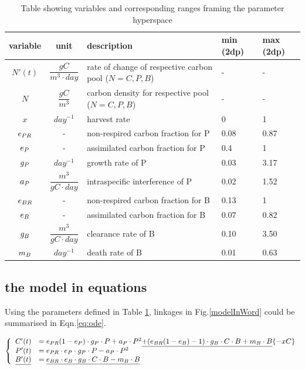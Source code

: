 \documentclass[../thesis.tex]{subfiles} %
\begin{document}
\begin{table}[H]
    \centering
    \caption[Algebra variables]{Table showing variables and corresponding ranges framing the parameter hyperspace}
    \begin{tabular}{cclll}\hline
        variable & unit & description & min (2dp) & max (2dp) \\\hline
        $N'(t)$ & $\dfrac{gC}{m^3\cdot day}$ & rate of change of respective carbon pool {\tiny($N=C,P,B$)} & - & - \\
        $N$ & $\dfrac{gC}{m^3}$ & carbon density for respective pool {\tiny($N=C,P,B$)} & - & - \\
        $x$ & $day^{-1}$ & harvest rate & 0 & 1 \\
        $e_{PR}$ & - & non-respired carbon fraction for P & 0.08 & 0.87 \\
        $e_P$ & - & assimilated carbon fraction for P & 0.4 & 1 \\
        $g_P$ & $day^{-1}$ & growth rate of P & 0.03 & 3.17 \\
        $a_P$ & $\dfrac{m^3}{gC\cdot day}$ & intraspecific interference of P & 0.02 & 1.52 \\
        $e_{BR}$ & - & non-respired carbon fraction for B & 0.13 & 1 \\
        $e_B$ & - & assimilated carbon fraction for B & 0.07 & 0.82 \\
        $g_B$ & $\dfrac{m^3}{gC\cdot day}$ & clearance rate of B & 0.10 & 3.50 \\
        $m_B$ & $day^{-1}$ & death rate of B & 0.01 & 0.63 \\
    \hline\end{tabular}
    \label{varInTab}
\end{table}

\subsection{the model in equations}
Using the parameters defined in Table \ref{varInTab}, linkages in Fig.\ref{modelInWord} could be summarised in Eqn.\ref{eq:ode}.

\begin{equation}\left\{\begin{array}{rl}
    C'(t) &= e_{PR}(1-e_P)\cdot g_P\cdot P +a_P\cdot P^2 \underline{+(e_{BR}(1-e_B)-1)\cdot g_B\cdot C\cdot B +m_B\cdot B} \{-xC\}\\
    P'(t) &= e_{PR}\cdot e_P\cdot g_P\cdot P -a_P\cdot P^2\\
    \underline{B'(t)} &= \underline{e_{BR}\cdot e_B\cdot g_B\cdot C\cdot B -m_B\cdot B}
\end{array}\right.\label{eq:ode}\end{equation}
\end{document}
